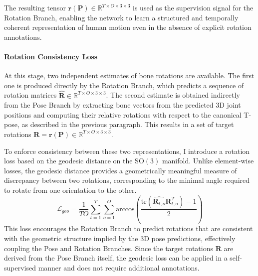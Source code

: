 The resulting tensor $\mathbf{r(P)} \in \mathbb{R}^{T \times O \times 3 \times 3}$
is used as the supervision signal for the Rotation Branch, enabling the network to learn a structured and temporally coherent representation of human motion even in the absence of explicit rotation annotations.

\paragraph{Rotation Consistency Loss}
At this stage, two independent estimates of bone rotations are available. The first one is produced directly by the Rotation Branch, which predicts a sequence of rotation matrices
$\hat{\mathbf{R}} \in \mathbb{R}^{T \times O \times 3 \times 3}$.
The second estimate is obtained indirectly from the Pose Branch by extracting bone vectors from the predicted 3D joint positions and computing their relative rotations with respect to the canonical T-pose, as described in the 
previous paragraph. This results in a set of target rotations
$\mathbf{R} = \mathbf{r(P)} \in \mathbb{R}^{T \times O \times 3 \times 3}$.

To enforce consistency between these two representations, I introduce a rotation loss based on the geodesic distance on the $\mathrm{SO}(3)$ manifold. Unlike element-wise losses, the geodesic distance provides a geometrically 
meaningful measure of discrepancy between two rotations, corresponding to the minimal angle required to rotate from one orientation to the other.
\begin{equation}
    \mathcal{L}_{geo} = \frac{1}{TO} \sum_{t=1}^{T} \sum_{o=1}^{O} \text{arccos} \left( \frac{\text{tr}(\hat{\mathbf{R}_{t,o}} \mathbf{R}^T_{t,o}) - 1}{2} \right)
\end{equation}
This loss encourages the Rotation Branch to predict rotations that are consistent with the geometric structure implied by the 3D pose predictions, effectively coupling the Pose and Rotation Branches. Since the target rotations 
$\mathbf{R}$ are derived from the Pose Branch itself, the geodesic loss can be applied in a self-supervised manner and does not require additional annotations.

